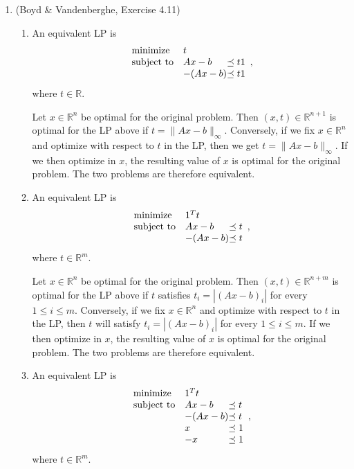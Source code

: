 \documentclass[letterpaper,12pt]{article}
\begin{document}
\begin{enumerate}
\item (Boyd \& Vandenberghe, Exercise 4.11)
\begin{enumerate}
\item An equivalent LP is
  \begin{equation*}
    \begin{array}{ll@{}ll}
      \text{minimize} & t \\
      \text{subject to}
        & Ax - b &\preceq t1 \\
        &-(Ax - b) &\preceq t1
    \end{array},
  \end{equation*}
  where $t \in \mathbb{R}$.

  Let $x \in \mathbb{R}^n$ be optimal for the original problem. Then
  $(x, t) \in \mathbb{R}^{n+1}$ is optimal for the LP above if
  $t = \lVert Ax - b \rVert_\infty$. Conversely, if we fix
  $x \in \mathbb{R}^n$ and optimize with respect to $t$ in the LP,
  then we get $t = \lVert Ax - b \rVert_\infty$. If we then optimize
  in $x$, the resulting value of $x$ is optimal for the original
  problem. The two problems are therefore equivalent.

\item An equivalent LP is
  \begin{equation*}
    \begin{array}{ll@{}ll}
      \text{minimize} & 1^T t \\
      \text{subject to}
        & Ax - b &\preceq t \\
        &-(Ax - b) &\preceq t
    \end{array},
  \end{equation*}
  where $t \in \mathbb{R}^m$.

  Let $x \in \mathbb{R}^n$ be optimal for the original problem. Then
  $(x, t) \in \mathbb{R}^{n+m}$ is optimal for the LP above if $t$
  satisfies $t_i = |(Ax - b)_i|$ for every $1 \leq i \leq
  m$. Conversely, if we fix $x \in \mathbb{R}^n$ and optimize with
  respect to $t$ in the LP, then $t$ will satisfy $t_i = |(Ax - b)_i|$
  for every $1 \leq i \leq m$. If we then optimize in $x$, the
  resulting value of $x$ is optimal for the original problem. The two
  problems are therefore equivalent.

\item An equivalent LP is
  \begin{equation*}
    \begin{array}{ll@{}ll}
      \text{minimize} & 1^T t \\
      \text{subject to}
        & Ax - b &\preceq t \\
        &-(Ax - b) &\preceq t \\
        &x &\preceq 1 \\
        &-x &\preceq 1
    \end{array},
  \end{equation*}
  where $t \in \mathbb{R}^m$.


\end{enumerate}
\end{enumerate}
\end{document}
